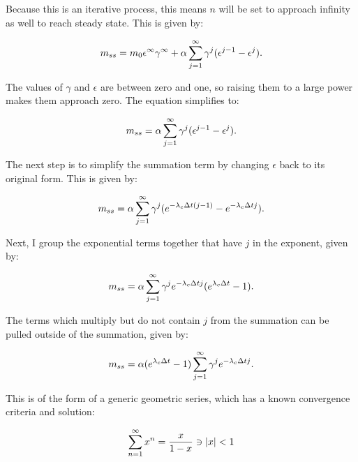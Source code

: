 Because this is an iterative process, this means $n$ will be set to approach infinity as well to reach steady state.
This is given by:

\begin{equation} \hfill
m_{ss} = m_0 \epsilon^{\infty} \gamma^{\infty} + \alpha \sum_{j=1}^{\infty} \gamma^j (\epsilon^{j-1} - \epsilon^j).
\hfill \end{equation}

The values of $\gamma$ and $\epsilon$ are between zero and one, so raising them to a large power makes them approach zero. The equation simplifies to:
 
\begin{equation} \hfill
m_{ss} = \alpha \sum_{j=1}^{\infty} \gamma^j (\epsilon^{j-1} - \epsilon^j).
\hfill \end{equation}

The next step is to simplify the summation term by changing $\epsilon$ back to its original form.
This is given by:

\begin{equation} \hfill
m_{ss} = \alpha \sum_{j=1}^{\infty} \gamma^j (e^{-\lambda_c \Delta t (j-1)} - e^{-\lambda_c \Delta t j}).
\hfill \end{equation}

Next, I group the exponential terms together that have $j$ in the exponent, given by:

\begin{equation} \hfill
m_{ss} = \alpha \sum_{j=1}^{\infty} \gamma^j e^{-\lambda_c \Delta t j} (e^{\lambda_c \Delta t} - 1).
\hfill \end{equation}

The terms which multiply but do not contain $j$ from the summation can be pulled outside of the summation, given by:

\begin{equation} \hfill
m_{ss} = \alpha (e^{\lambda_c \Delta t} - 1) \sum_{j=1}^{\infty} \gamma^j e^{-\lambda_c \Delta t j}.
\hfill \end{equation}

This is of the form of a generic geometric series, which has a known convergence criteria and solution:

\begin{equation} \hfill
\sum_{n=1}^{\infty} x^n = \frac{x}{1-x} \ni |x| < 1
\hfill \end{equation}

